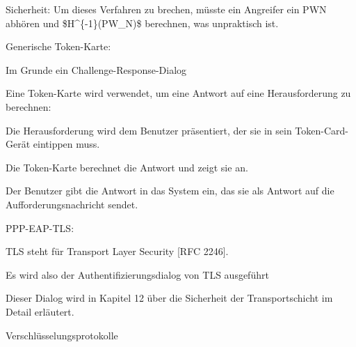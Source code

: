 \documentclass[a4paper]{article}
\begin{document}
\begin{multicols}{3}
\begin{itemize*}
\begin{itemize*}
                  \item Sicherheit: Um dieses Verfahren zu brechen, müsste ein Angreifer ein PWN abhören und \$H\^{}\{-1\}(PW\_N)\$ berechnen, was unpraktisch ist.
            \end{itemize*}
            \item Generische Token-Karte:
            \begin{itemize*}
                  \item Im Grunde ein Challenge-Response-Dialog
                  \item Eine Token-Karte wird verwendet, um eine Antwort auf eine Herausforderung zu berechnen:
                  \begin{itemize*} \item Die Herausforderung wird dem Benutzer präsentiert, der sie in sein Token-Card-Gerät eintippen muss. \item Die Token-Karte berechnet die Antwort und zeigt sie an. \item Der Benutzer gibt die Antwort in das System ein, das sie als Antwort auf die Aufforderungsnachricht sendet. \end{itemize*}
            \end{itemize*}
            \item PPP-EAP-TLS:
            \begin{itemize*}
                  \item TLS steht für Transport Layer Security {[}RFC 2246{]}.
                  \item Es wird also der Authentifizierungsdialog von TLS ausgeführt
                  \item Dieser Dialog wird in Kapitel 12 über die Sicherheit der Transportschicht im Detail erläutert.
            \end{itemize*}
      \end{itemize*}

      Verschlüsselungsprotokolle


\end{multicols}
\end{document}
